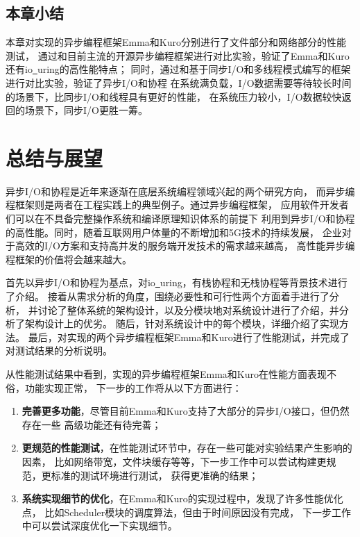 \documentclass[supercite]{HustGraduPaper}
\theoremstyle{definition}
\begin{document}
\subsection{本章小结}
本章对实现的异步编程框架Emma和Kuro分别进行了文件部分和网络部分的性能测试，
通过和目前主流的开源异步编程框架进行对比实验，验证了Emma和Kuro还有io\underline{~}uring的高性能特点；
同时，通过和基于同步I/O和多线程模式编写的框架进行对比实验，验证了异步I/O和协程
在系统满负载，I/O数据需要等待较长时间的场景下，比同步I/O和线程具有更好的性能，
在系统压力较小，I/O数据较快返回的场景下，同步I/O更胜一筹。\par

\section{总结与展望}
异步I/O和协程是近年来逐渐在底层系统编程领域兴起的两个研究方向，
而异步编程框架则是两者在工程实践上的典型例子。通过异步编程框架，
应用软件开发者们可以在不具备完整操作系统和编译原理知识体系的前提下
利用到异步I/O和协程的高性能。同时，随着互联网用户体量的不断增加和5G技术的持续发展，
企业对于高效的I/O方案和支持高并发的服务端开发技术的需求越来越高，
高性能异步编程框架的价值将会越来越大。\par

首先以异步I/O和协程为基点，对io\underline{~}uring，有栈协程和无栈协程等背景技术进行了介绍。
接着从需求分析的角度，围绕必要性和可行性两个方面着手进行了分析，
并讨论了整体系统的架构设计，以及分模块地对系统设计进行了介绍，并分析了架构设计上的优劣。
随后，针对系统设计中的每个模块，详细介绍了实现方法。
最后，对实现的两个异步编程框架Emma和Kuro进行了性能测试，并完成了对测试结果的分析说明。\par

从性能测试结果中看到，实现的异步编程框架Emma和Kuro在性能方面表现不俗，功能实现正常，
下一步的工作将从以下方面进行：

\begin{enumerate}[label={(\arabic*)}]
  \item \textbf{完善更多功能}，尽管目前Emma和Kuro支持了大部分的异步I/O接口，但仍然存在一些
    高级功能还有待完善；
  \item \textbf{更规范的性能测试}，在性能测试环节中，存在一些可能对实验结果产生影响的因素，
    比如网络带宽，文件块缓存等等，下一步工作中可以尝试构建更规范，更标准的测试环境进行测试，
    获得更准确的结果；
  \item \textbf{系统实现细节的优化}，在Emma和Kuro的实现过程中，发现了许多性能优化点，
    比如Scheduler模块的调度算法，但由于时间原因没有完成，
    下一步工作中可以尝试深度优化一下实现细节。
\end{enumerate}
\end{document}
